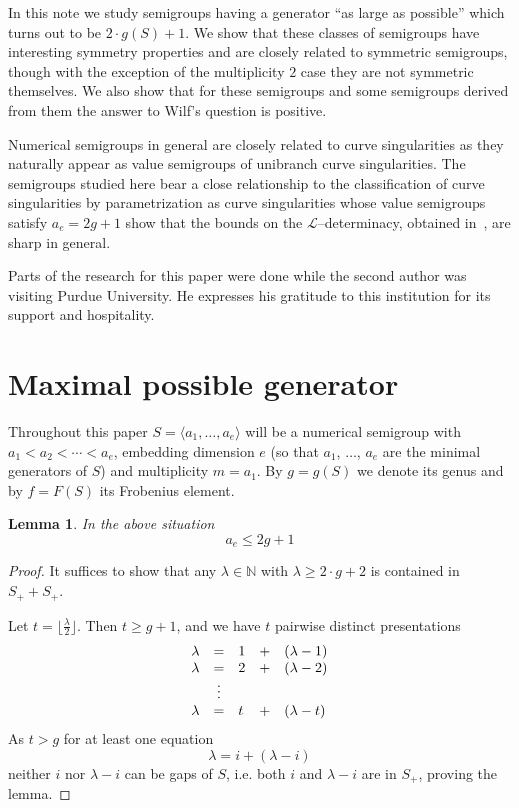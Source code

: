 \documentclass[a4paper,12pt,scrbook]{amsart}
\def \N{\mathbb N}
\theoremstyle{plain}%
\newtheorem{lemma}[satz]{Lemma}
\theoremstyle{definition}
\begin{document}
In this note we study semigroups having a generator ``as large as 
possible'' which turns out to be $2 \cdot g(S)+1$. We show that 
these classes of semigroups have interesting symmetry properties and 
are closely related to symmetric semigroups, though with the exception 
of the multiplicity $2$ case they are not symmetric themselves. We also 
show that for these semigroups and some semigroups derived from them 
the answer to Wilf's question is positive. 

Numerical semigroups in general are closely related to curve singularities 
as they naturally appear as value semigroups of unibranch curve 
singularities. The semigroups studied here bear a close relationship  
to the classification of curve singularities by parametrization as 
curve singularities whose value semigroups satisfy $a_e = 2g+1$ show 
that the bounds on the $\mathcal{L}$--determinacy,  obtained 
in~\cite{HS}, are sharp in general.  

Parts of the research for this paper were done while the second author 
was visiting Purdue University. He expresses his gratitude to this 
institution for its support and hospitality. 

\section{Maximal possible generator}\label{sect:basic}

Throughout this paper $S = \langle a_1, \ldots, a_e\rangle$ 
will be a numerical semigroup with $a_1 < a_2 < \cdots < a_e$, 
embedding dimension $e$ (so that $a_1$, $\ldots$, $a_e$ are 
the minimal generators of $S$) and multiplicity $m = a_1$. By 
$g=g(S)$ we denote its genus and by $f = F(S)$ its Frobenius 
element. 

\begin{lemma}\label{lem:an_genus}
In the above situation
	$$ a_e \leq 2 g + 1 $$
\end{lemma}

\begin{proof} 
It suffices to show that any $\lambda \in\N$ with $\lambda  \geq 2 \cdot g + 2$ is 
contained in $S_+ + S_+$. 

Let $t = \lfloor \frac {\lambda}{2} \rfloor$. Then $t \geq g + 1$, and we have 
$t$ pairwise distinct presentations  
	$$ \begin{array} {l c l c l}
	\lambda & = & 1 & + & (\lambda - 1) \\
	\lambda & = & 2 & + & (\lambda - 2) \\
	& \vdots & & & \\
	\lambda & = & t & + & (\lambda - t) \\
	\end{array} $$
As $t > g$ for at least one equation
	$$ \lambda  = i  + (\lambda - i) $$
neither $i$ nor $\lambda-i$ can be gaps of $S$, i.e. both $i$ and $\lambda - i$ are in 
$S_+$, proving the lemma. 
\end{proof}
\end{document}
